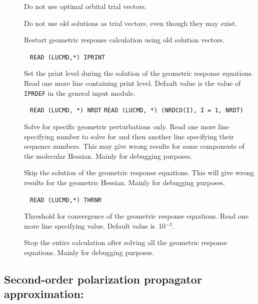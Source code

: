 \begin{description}
\item[] Do not use optimal orbital 
trial vectors. 

\item[] Do not use old solutions as trial vectors, even
though they may exist.

\item[] Restart geometric response calculation using old
solution vectors.

\item[]\verb| |\newline
\verb|READ (LUCMD,*) IPRINT|

Set the print level during the solution of the geometric response
equations.  Read one more line containing print level. Default
value is the value of \verb|IPRDEF| in the general input module.

\item[]\verb| |\newline
\verb|READ (LUCMD, *) NRDT|\newline
\verb|READ (LUCMD, *) (NRDCO(I), I = 1, NRDT)|

Solve for specific geometric perturbations only.  Read
one more line specifying number to solve for and then another
line specifying their sequence numbers. This may give wrong results
for some components of the molecular Hessian. Mainly for debugging
purposes. 

\item[] Skip the solution of the geometric response
equations. This will give wrong results for the geometric Hessian.
Mainly for debugging purposes.

\item[]\verb| |\newline
\verb|READ (LUCMD,*) THRNR|

Threshold for convergence of the geometric response
equations.  Read one more line specifying value.  Default
value is~10$^{-3}$.

\item[] Stop the entire calculation after solving all
the geometric  response equations. Mainly for debugging purposes.
\end{description}

\subsection{Second-order polarization propagator approximation:
}\label{sec:soppa}

